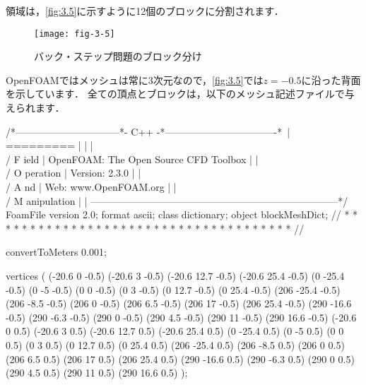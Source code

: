 領域は，\autoref{fig:3.5}に示すように12個のブロックに分割されます．


\begin{figure}[ht]
 \texttt{[image: fig-3-5]}
 \caption{バック・ステップ問題のブロック分け}
 \label{fig:3.5}
\end{figure}


OpenFOAMではメッシュは常に3次元なので，\autoref{fig:3.5}では$z = -0.5$に沿った背面を示しています．
全ての頂点とブロックは，以下のメッシュ記述ファイルで与えられます．
\begin{OFverbatim}
/*--------------------------------*- C++ -*----------------------------------*\
| =========                 |                                                 |
| \\      /  F ield         | OpenFOAM: The Open Source CFD Toolbox           |
|  \\    /   O peration     | Version:  2.3.0                                 |
|   \\  /    A nd           | Web:      www.OpenFOAM.org                      |
|    \\/     M anipulation  |                                                 |
\*---------------------------------------------------------------------------*/
FoamFile
{
    version     2.0;
    format      ascii;
    class       dictionary;
    object      blockMeshDict;
}
// * * * * * * * * * * * * * * * * * * * * * * * * * * * * * * * * * * * * * //

convertToMeters 0.001;

vertices
(
    (-20.6 0 -0.5)
    (-20.6 3 -0.5)
    (-20.6 12.7 -0.5)
    (-20.6 25.4 -0.5)
    (0 -25.4 -0.5)
    (0 -5 -0.5)
    (0 0 -0.5)
    (0 3 -0.5)
    (0 12.7 -0.5)
    (0 25.4 -0.5)
    (206 -25.4 -0.5)
    (206 -8.5 -0.5)
    (206 0 -0.5)
    (206 6.5 -0.5)
    (206 17 -0.5)
    (206 25.4 -0.5)
    (290 -16.6 -0.5)
    (290 -6.3 -0.5)
    (290 0 -0.5)
    (290 4.5 -0.5)
    (290 11 -0.5)
    (290 16.6 -0.5)
    (-20.6 0 0.5)
    (-20.6 3 0.5)
    (-20.6 12.7 0.5)
    (-20.6 25.4 0.5)
    (0 -25.4 0.5)
    (0 -5 0.5)
    (0 0 0.5)
    (0 3 0.5)
    (0 12.7 0.5)
    (0 25.4 0.5)
    (206 -25.4 0.5)
    (206 -8.5 0.5)
    (206 0 0.5)
    (206 6.5 0.5)
    (206 17 0.5)
    (206 25.4 0.5)
    (290 -16.6 0.5)
    (290 -6.3 0.5)
    (290 0 0.5)
    (290 4.5 0.5)
    (290 11 0.5)
    (290 16.6 0.5)
);


\end{OFverbatim}
